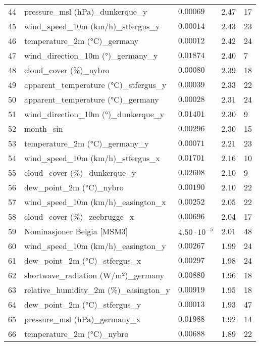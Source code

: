 \begin{table}[H]
\begin{tabular}{r l l l l}
        44 & pressure\_msl (hPa)\_dunkerque\_y & $0.00069$ & 2.47 & 17 \\
        45 & wind\_speed\_10m (km/h)\_stfergus\_y & $0.00014$ & 2.43 & 23 \\
        46 & temperature\_2m (°C)\_germany & $0.00012$ & 2.42 & 24 \\
        47 & wind\_direction\_10m (°)\_germany\_y & $0.01874$ & 2.40 & 7 \\
        48 & cloud\_cover (\%)\_nybro & $0.00080$ & 2.39 & 18 \\
        49 & apparent\_temperature (°C)\_stfergus\_y & $0.00039$ & 2.33 & 22 \\
        50 & apparent\_temperature (°C)\_germany & $0.00028$ & 2.31 & 24 \\
        51 & wind\_direction\_10m (°)\_dunkerque\_y & $0.01401$ & 2.30 & 9 \\
        52 & month\_sin & $0.00296$ & 2.30 & 15 \\
        53 & temperature\_2m (°C)\_germany\_y & $0.00071$ & 2.21 & 23 \\
        54 & wind\_speed\_10m (km/h)\_stfergus\_x & $0.01701$ & 2.16 & 10 \\
        55 & cloud\_cover (\%)\_dunkerque\_y & $0.02608$ & 2.10 & 9 \\
        56 & dew\_point\_2m (°C)\_nybro & $0.00190$ & 2.10 & 22 \\
        57 & wind\_speed\_10m (km/h)\_easington\_x & $0.00252$ & 2.05 & 22 \\
        58 & cloud\_cover (\%)\_zeebrugge\_x & $0.00696$ & 2.04 & 17 \\
        59 & Nominasjoner Belgia [MSM3] & $4.50 \cdot 10^{-5}$ & 2.01 & 48 \\
        60 & wind\_speed\_10m (km/h)\_easington\_y & $0.00267$ & 1.99 & 24 \\
        61 & dew\_point\_2m (°C)\_stfergus\_x & $0.00297$ & 1.98 & 24 \\
        62 & shortwave\_radiation (W/m²)\_germany & $0.00880$ & 1.96 & 18 \\
        63 & relative\_humidity\_2m (\%)\_easington\_y & $0.00919$ & 1.95 & 18 \\
        64 & dew\_point\_2m (°C)\_stfergus\_y & $0.00013$ & 1.93 & 47 \\
        65 & pressure\_msl (hPa)\_germany\_x & $0.01988$ & 1.92 & 14 \\
        66 & temperature\_2m (°C)\_nybro & $0.00688$ & 1.89 & 22 \\

\end{tabular}
\end{table}
